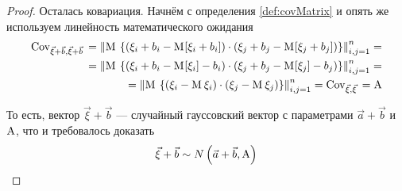 \begin{proof}
    Осталась ковариация. Начнём с определения \ref{def:covMatrix} и опять же
    используем линейность математического ожидания
    \begin{align*}
        \mathrm{Cov}_{\vec{\xi} + \vec{b}, \vec{\xi} + \vec{b}}\,
        = \left\| \mathrm{M}_{}\,
            \left\{ \left( \xi_i + b_i - \mathrm{M}_{}\!\left[ \xi_i + b_i \right] \right)
                \cdot \left( \xi_j + b_j - \mathrm{M}_{}\!\left[ \xi_j + b_j \right] \right)
            \right\} \right\|_{i,j=1}^n = \\
        = \left\| \mathrm{M}_{}\,
            \left\{ \left( \xi_i + b_i - \mathrm{M}_{}\!\left[ \xi_i \right] - b_i \right)
                \cdot \left( \xi_j + b_j - \mathrm{M}_{}\!\left[ \xi_j \right] - b_j \right)
            \right\} \right\|_{i,j=1}^n = \\
        = \left\| \mathrm{M}_{}\,
            \left\{ \left( \xi_i - \mathrm{M}_{}\,\xi_i \right)
                \cdot \left( \xi_j - \mathrm{M}_{}\,\xi_j \right)
            \right\} \right\|_{i,j=1}^n
        = \mathrm{Cov}_{\vec{\xi}, \vec{\xi}}\, = \mathrm{A}
    \end{align*}

    То есть, вектор $\vec{\xi} + \vec{b}$ --- случайный гауссовский вектор с
    параметрами $\vec{a} + \vec{b}$ и $\mathrm{A}$, что и требовалось доказать
    $$\vec{\xi} + \vec{b} \sim N\left( \vec{a} + \vec{b}, \mathrm{A} \right)$$
\end{proof}

